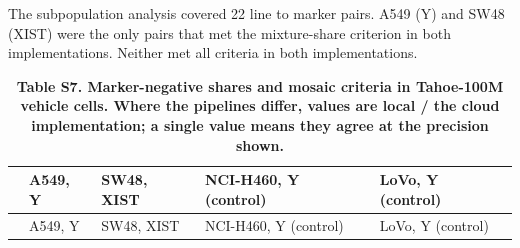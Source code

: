 \documentclass[
  11pt,
  letterpaper,
]{article}
\begin{document}
The subpopulation analysis covered 22 line to marker pairs. A549 (Y) and
SW48 (XIST) were the only pairs that met the mixture-share criterion in
both implementations. Neither met all criteria in both implementations.

\begin{longtable}[]{@{}
  >{\raggedright\arraybackslash}p{}
  >{\raggedright\arraybackslash}p{}
  >{\raggedright\arraybackslash}p{}
  >{\raggedright\arraybackslash}p{}
  >{\raggedright\arraybackslash}p{}@{}}
\caption{\textbf{Table S7. Marker-negative shares and mosaic criteria in
Tahoe-100M vehicle cells. Where the pipelines differ, values are local /
the cloud implementation; a single value means they agree at the
precision shown.}}\tabularnewline
\toprule\noalign{}
\begin{minipage}[b]{\linewidth}\raggedright
\end{minipage} & \begin{minipage}[b]{\linewidth}\raggedright
A549, Y
\end{minipage} & \begin{minipage}[b]{\linewidth}\raggedright
SW48, XIST
\end{minipage} & \begin{minipage}[b]{\linewidth}\raggedright
NCI-H460, Y (control)
\end{minipage} & \begin{minipage}[b]{\linewidth}\raggedright
LoVo, Y (control)
\end{minipage} \\
\midrule\noalign{}
\endfirsthead
\toprule\noalign{}
\begin{minipage}[b]{\linewidth}\raggedright
\end{minipage} & \begin{minipage}[b]{\linewidth}\raggedright
A549, Y
\end{minipage} & \begin{minipage}[b]{\linewidth}\raggedright
SW48, XIST
\end{minipage} & \begin{minipage}[b]{\linewidth}\raggedright
NCI-H460, Y (control)
\end{minipage} & \begin{minipage}[b]{\linewidth}\raggedright
LoVo, Y (control)
\end{minipage} \\

\end{longtable}
\end{document}
